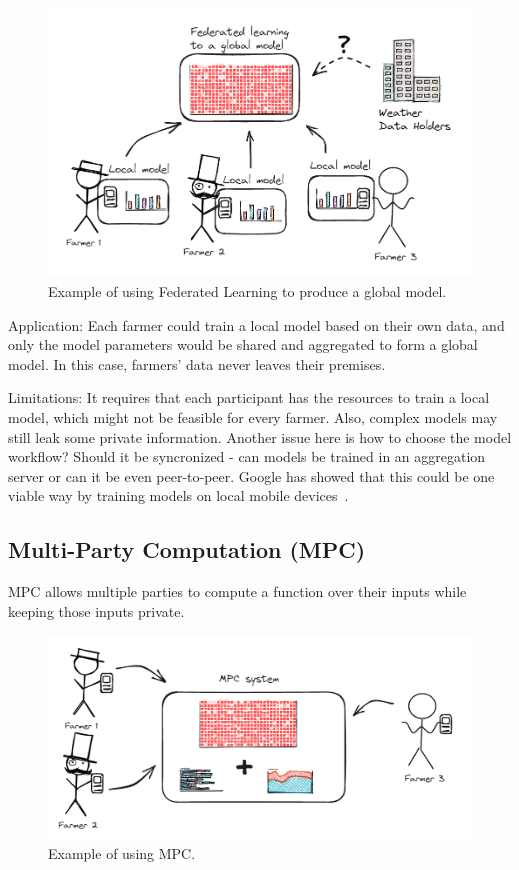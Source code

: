 \begin{figure}[!htbp]
  \centering
  \includegraphics[width=\textwidth]{assets/img_2}
  \caption{Example of using Federated Learning to produce a global model.}
  \label{fig:img_2}
\end{figure}

Application: Each farmer could train a local model based on their own data, and only the model parameters would
be shared and aggregated to form a global model.
In this case, farmers' data never leaves their premises.

Limitations: It requires that each participant has the resources to train a local model,
which might not be feasible for every farmer.
Also, complex models may still leak some private information. Another issue here is how to choose the model workflow?
Should it be syncronized - can models be trained in an aggregation server or can it be even peer-to-peer. Google has showed that
this could be one viable way by training models on local mobile devices~\cite[]{mcmahan2017communication}.

\subsection{Multi-Party Computation (MPC)}
MPC allows multiple parties to compute a function over their inputs while keeping those inputs private.

\begin{figure}[!htbp]
  \centering
  \includegraphics[width=\textwidth]{assets/img_4}
  \caption{Example of using MPC.}
  \label{fig:img_4}
\end{figure}

